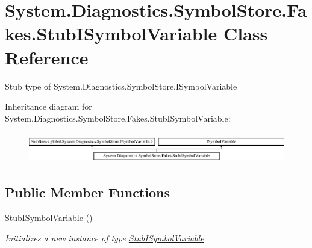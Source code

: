 \hypertarget{class_system_1_1_diagnostics_1_1_symbol_store_1_1_fakes_1_1_stub_i_symbol_variable}{\section{System.\-Diagnostics.\-Symbol\-Store.\-Fakes.\-Stub\-I\-Symbol\-Variable Class Reference}
\label{class_system_1_1_diagnostics_1_1_symbol_store_1_1_fakes_1_1_stub_i_symbol_variable}
}


Stub type of System.\-Diagnostics.\-Symbol\-Store.\-I\-Symbol\-Variable 


Inheritance diagram for System.\-Diagnostics.\-Symbol\-Store.\-Fakes.\-Stub\-I\-Symbol\-Variable\-:\begin{figure}[H]
\begin{center}
\leavevmode
\includegraphics[height=1.349398cm]{class_system_1_1_diagnostics_1_1_symbol_store_1_1_fakes_1_1_stub_i_symbol_variable}
\end{center}
\end{figure}
\subsection*{Public Member Functions}
\begin{DoxyCompactItemize}
\item 
\hyperlink{class_system_1_1_diagnostics_1_1_symbol_store_1_1_fakes_1_1_stub_i_symbol_variable_a81ce7215d3c0face75a89647a4d2237f}{Stub\-I\-Symbol\-Variable} ()
\begin{DoxyCompactList}\small\item\em Initializes a new instance of type \hyperlink{class_system_1_1_diagnostics_1_1_symbol_store_1_1_fakes_1_1_stub_i_symbol_variable}{Stub\-I\-Symbol\-Variable}\end{DoxyCompactList}\end{DoxyCompactItemize}

